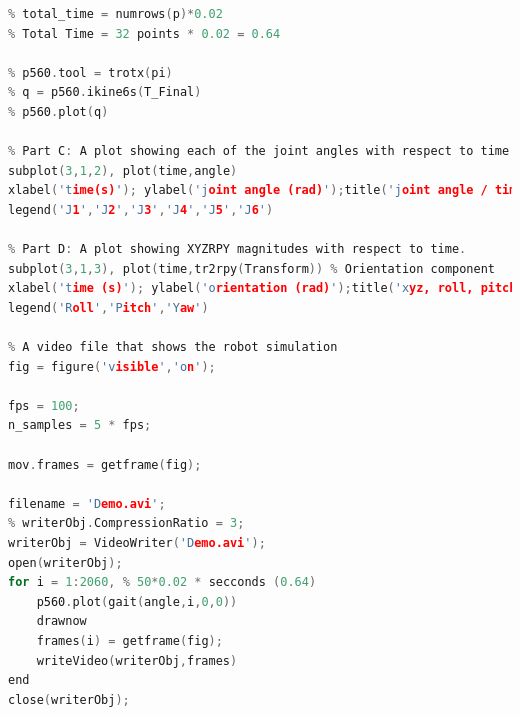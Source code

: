 \documentclass[a4paper, 10pt]{article}
\begin{document}
\begin{lstlisting}[language = C++]
% total_time = timesteps * step time
% total_time = numrows(p)*0.02 
% Total Time = 32 points * 0.02 = 0.64

% p560.tool = trotx(pi)
% q = p560.ikine6s(T_Final)
% p560.plot(q)

% Part C: A plot showing each of the joint angles with respect to time
subplot(3,1,2), plot(time,angle)
xlabel('time(s)'); ylabel('joint angle (rad)');title('joint angle / time')
legend('J1','J2','J3','J4','J5','J6')

% Part D: A plot showing XYZRPY magnitudes with respect to time.
subplot(3,1,3), plot(time,tr2rpy(Transform)) % Orientation component
xlabel('time (s)'); ylabel('orientation (rad)');title('xyz, roll, pitch, yaw')
legend('Roll','Pitch','Yaw')

% A video file that shows the robot simulation
fig = figure('visible','on');

fps = 100;
n_samples = 5 * fps;

mov.frames = getframe(fig);

filename = 'Demo.avi';
% writerObj.CompressionRatio = 3;
writerObj = VideoWriter('Demo.avi');
open(writerObj);
for i = 1:2060, % 50*0.02 * secconds (0.64)
    p560.plot(gait(angle,i,0,0))
    drawnow
    frames(i) = getframe(fig);
    writeVideo(writerObj,frames)
end
close(writerObj);


\end{lstlisting}
\end{document}
